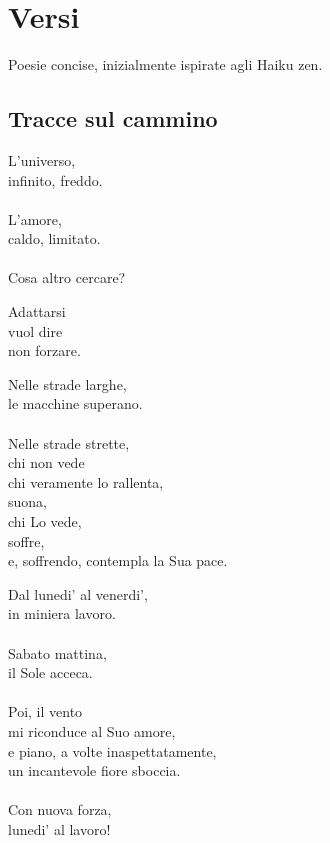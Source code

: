 \chapter{Versi}

Poesie concise, inizialmente ispirate agli Haiku zen.\\

\vfill

\section{Tracce sul cammino}

\begin{haiku}
L'universo,\\
infinito, freddo.\\
\leavevmode\\
L'amore,\\
caldo, limitato.\\
\leavevmode\\
Cosa altro cercare?\\
\end{haiku}


\begin{haiku}
Adattarsi \\
vuol dire\\
non forzare.\\
\end{haiku}

\begin{haiku}
Nelle strade larghe,\\
le macchine superano.\\
\leavevmode\\
Nelle strade strette,\\
chi non vede \\
    chi veramente lo rallenta,\\
suona,\\
chi Lo vede,\\
soffre,\\
e, soffrendo, contempla la Sua pace.\\
\end{haiku}

\begin{haiku}
Dal lunedi' al venerdi',\\
in miniera lavoro.\\
\leavevmode\\
Sabato mattina,\\
il Sole acceca.\\
\leavevmode\\
Poi, il vento\\
mi riconduce al Suo amore,\\
e piano, a volte inaspettatamente,\\
un incantevole fiore sboccia.\\
\leavevmode\\
Con nuova forza,\\
lunedi' al lavoro!\\
\end{haiku}

